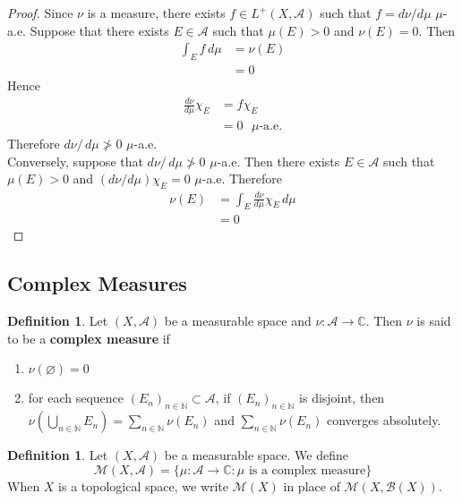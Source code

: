 \documentclass[12pt]{amsart}
\theoremstyle{definition}
\newtheorem{defn}[definition]{Definition}
\newcommand{\C}{\mathbb{C}}
\newcommand{\N}{\mathbb{N}}
\newcommand{\MA}{\mathcal{A}}
\newcommand{\MB}{\mathcal{B}}
\newcommand{\MM}{\mathcal{M}}
\newcommand{\dmu}{\, d \mu}
\newcommand{\ld}[1]{\label{defn:#1}}
\begin{document}
	\begin{proof}
		Since $\nu$ is a measure, there exists $f \in L^+(X, \MA)$ such that $f = d\nu/ d\mu$ $\mu$-a.e. Suppose that there exists $E \in \MA$ such that $\mu(E) > 0$ and $\nu(E) = 0$. Then 
		\begin{align*}
			\int_E f \dmu  
			& = \nu(E) \\
			& = 0 
		\end{align*}
		Hence 
		\begin{align*}
			\frac{d \nu}{d\mu}\chi_E 
			& = f \chi_E \\
			& = 0 \text{ $\mu$-a.e.}
		\end{align*} 
		Therefore $d\nu / \dmu \not > 0$ $\mu$-a.e.\\
		Conversely, suppose that $d\nu / \dmu \not > 0$ $\mu$-a.e. Then there exists $E \in \MA$ such that $\mu(E) > 0$ and $(d \nu / d\mu)\chi_E = 0$ $\mu$-a.e. Therefore 
		\begin{align*}
			\nu(E)
			& = \int_E \frac{d \nu}{d\mu}\chi_E  \dmu \\
			& = 0
		\end{align*}
	\end{proof}
	
	
	
	
	
	
	
	
	
	
	\newpage	
	\subsection{Complex Measures}
	
	\begin{defn} \ld{43001} 
		Let $(X, \MA)$ be a measurable space and $\nu:\MA \rightarrow \C$. Then $\nu$ is said to be a \textbf{complex measure} if 
		\begin{enumerate}
			\item $\nu (\varnothing) = 0$
			\item for each sequence $(E_n)_{n \in \N} \subset \MA$, if $(E_n)_{n \in \N}$ is disjoint, then $\nu(\bigcup_{n \in \N} E_n) = \sum_{n \in \N} \nu(E_n)$ and $\sum_{n \in \N} \nu(E_n)$ converges absolutely. 
		\end{enumerate}
	\end{defn}
	
	\begin{defn} \ld{43002} 
	Let $(X, \MA)$ be a measurable space. We define $$\MM(X, \MA) = \{\mu:\MA \rightarrow \C: \mu \text{ is a complex measure}\}$$
	When $X$ is a topological space, we write $\MM(X)$ in place of $\MM(X, \MB(X))$.
	\end{defn}
\end{document}
